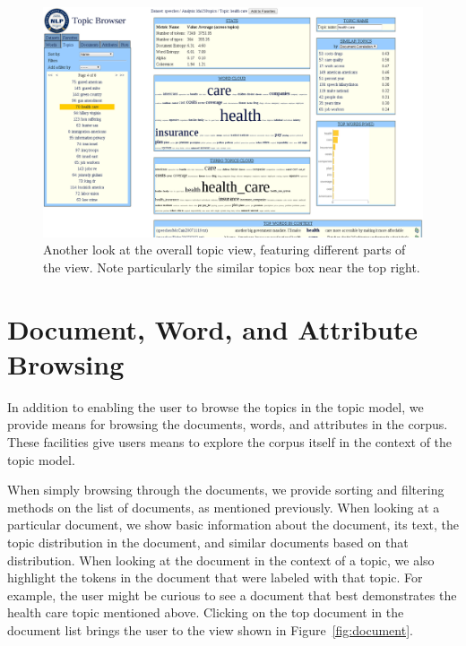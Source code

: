 \documentclass{article}
\begin{document}
\begin{figure}
  \centering
  \includegraphics[width=\textwidth]{similar_topics}
  \caption{Another look at the overall topic view, featuring different parts of
  the view.  Note particularly the similar topics box near the top right.}
  \label{fig:similar}
\end{figure}

\section{Document, Word, and Attribute Browsing}

In addition to enabling the user to browse the topics in the topic model, we
provide means for browsing the documents, words, and attributes in the corpus.
These facilities give users means to explore the corpus itself in the context
of the topic model.

When simply browsing through the documents, we provide sorting and filtering
methods on the list of documents, as mentioned previously.  When looking at a
particular document, we show basic information about the document, its text,
the topic distribution in the document, and similar documents based on that
distribution.  When looking at the document in the context of a topic, we also
highlight the tokens in the document that were labeled with that topic.  For
example, the user might be curious to see a document that best demonstrates the
health care topic mentioned above.  Clicking on the top document in the document list brings the user to the view shown in Figure~\ref{fig:document}.
\end{document}

